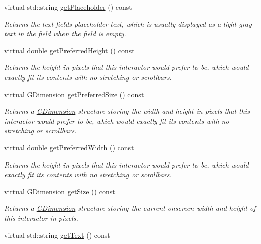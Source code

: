 \begin{DoxyCompactItemize}
virtual std\+::string \mbox{\hyperlink{classGTextField_aa78dbaa7dac1f8cdf9048c91abecc7ad}{get\+Placeholder}} () const
\begin{DoxyCompactList}\small\item\em Returns the text field\textquotesingle{}s placeholder text, which is usually displayed as a light gray text in the field when the field is empty. \end{DoxyCompactList}\item 
virtual double \mbox{\hyperlink{classGInteractor_a747de0961653847bdc6615dbf756d715}{get\+Preferred\+Height}} () const
\begin{DoxyCompactList}\small\item\em Returns the height in pixels that this interactor would prefer to be, which would exactly fit its contents with no stretching or scrollbars. \end{DoxyCompactList}\item 
virtual \mbox{\hyperlink{classGDimension}{G\+Dimension}} \mbox{\hyperlink{classGInteractor_a4aabbee761d8e9116275401131b7ccd1}{get\+Preferred\+Size}} () const
\begin{DoxyCompactList}\small\item\em Returns a \mbox{\hyperlink{classGDimension}{G\+Dimension}} structure storing the width and height in pixels that this interactor would prefer to be, which would exactly fit its contents with no stretching or scrollbars. \end{DoxyCompactList}\item 
virtual double \mbox{\hyperlink{classGInteractor_a82bca31d37700fb0e35d2743352efd5e}{get\+Preferred\+Width}} () const
\begin{DoxyCompactList}\small\item\em Returns the height in pixels that this interactor would prefer to be, which would exactly fit its contents with no stretching or scrollbars. \end{DoxyCompactList}\item 
virtual \mbox{\hyperlink{classGDimension}{G\+Dimension}} \mbox{\hyperlink{classGInteractor_a7b4eec96a2bdc6420695d5796a78eea9}{get\+Size}} () const
\begin{DoxyCompactList}\small\item\em Returns a \mbox{\hyperlink{classGDimension}{G\+Dimension}} structure storing the current onscreen width and height of this interactor in pixels. \end{DoxyCompactList}\item 
virtual std\+::string \mbox{\hyperlink{classGTextField_aff553c50924b836c29f146ed34a7c6ec}{get\+Text}} () const

\end{DoxyCompactItemize}
